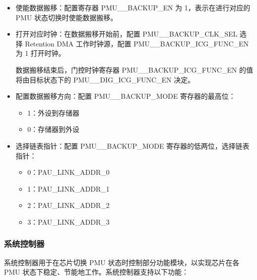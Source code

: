 \documentclass[main\_\_CN.tex]{subfiles}
\begin{document}
\begin{itemize}
\item 使能数据搬移：配置寄存器 PMU\_\_BACKUP\_EN 为 1，表示在进行对应的 PMU 状态切换时使能数据搬移。

\item 打开对应时钟：在数据搬移开始前，配置 PMU\_\_BACKUP\_CLK\_SEL 选择 Retention DMA 工作时钟源，配置 PMU\_\_BACKUP\_ICG\_FUNC\_EN 为 1 打开时钟。

数据搬移结束后，门控时钟寄存器 PMU\_\_BACKUP\_ICG\_FUNC\_EN 的值将由目标状态下的 PMU\_\_DIG\_ICG\_FUNC\_EN 决定。

\item 配置数据搬移方向：配置 PMU\_\_BACKUP\_MODE 寄存器的最高位：
    \begin{itemize}
        \item 1：外设到存储器
        \item 0：存储器到外设
    \end{itemize}

\item 选择链表指针：配置 PMU\_\_BACKUP\_MODE 寄存器的低两位，选择链表指针：
    \begin{itemize}
    \item 0：PAU\_LINK\_ADDR\_0
    \item 1：PAU\_LINK\_ADDR\_1
    \item 2：PAU\_LINK\_ADDR\_2
    \item 3：PAU\_LINK\_ADDR\_3
    \end{itemize}
\end{itemize}

\subsubsection{系统控制器}

系统控制器用于在芯片切换 PMU 状态时控制部分功能模块，以实现芯片在各 PMU 状态下稳定、节能地工作。系统控制器支持以下功能：
\end{document}
